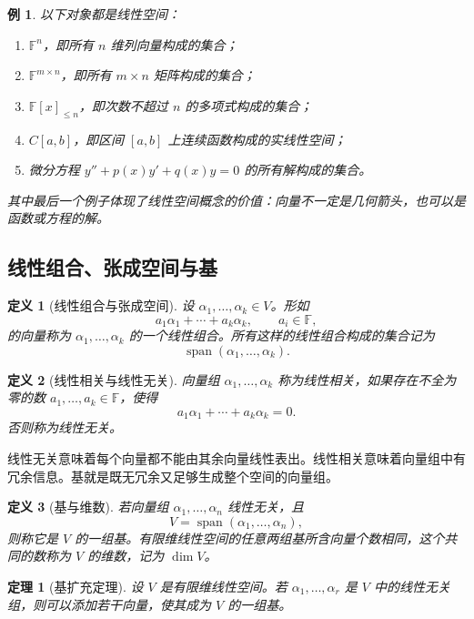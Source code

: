 \documentclass[UTF8,openany,zihao=-4]{ctexbook}
\theoremstyle{cnplain}
\newtheorem{definition}{定义}[chapter]
\newtheorem{theorem}{定理}[chapter]
\newtheorem{example}{例}[chapter]
\newcommand{\F}{\mathbb F}
\newcommand{\Span}{\operatorname{span}}
\begin{document}
\begin{example}
以下对象都是线性空间：
\begin{enumerate}
  \item $\F^n$，即所有 $n$ 维列向量构成的集合；
  \item $\F^{m\times n}$，即所有 $m\times n$ 矩阵构成的集合；
  \item $\F[x]_{\le n}$，即次数不超过 $n$ 的多项式构成的集合；
  \item $C[a,b]$，即区间 $[a,b]$ 上连续函数构成的实线性空间；
  \item 微分方程 $y''+p(x)y'+q(x)y=0$ 的所有解构成的集合。
\end{enumerate}
其中最后一个例子体现了线性空间概念的价值：向量不一定是几何箭头，也可以是函数或方程的解。
\end{example}

\subsection{线性组合、张成空间与基}

\begin{definition}[线性组合与张成空间]
设 $\alpha_1,\ldots,\alpha_k\in V$。形如
\[
a_1\alpha_1+\cdots+a_k\alpha_k,\qquad a_i\in\F,
\]
的向量称为 $\alpha_1,\ldots,\alpha_k$ 的一个线性组合。所有这样的线性组合构成的集合记为
\[
\Span(\alpha_1,
\ldots,\alpha_k).
\]
\end{definition}

\begin{definition}[线性相关与线性无关]
向量组 $\alpha_1,\ldots,\alpha_k$ 称为线性相关，如果存在不全为零的数 $a_1,
\ldots,a_k\in\F$，使得
\[
a_1\alpha_1+\cdots+a_k\alpha_k=0.
\]
否则称为线性无关。
\end{definition}

线性无关意味着每个向量都不能由其余向量线性表出。线性相关意味着向量组中有冗余信息。基就是既无冗余又足够生成整个空间的向量组。

\begin{definition}[基与维数]
若向量组 $\alpha_1,\ldots,\alpha_n$ 线性无关，且
\[
V=\Span(\alpha_1,
\ldots,\alpha_n),
\]
则称它是 $V$ 的一组基。有限维线性空间的任意两组基所含向量个数相同，这个共同的数称为 $V$ 的维数，记为 $\dim V$。
\end{definition}

\begin{theorem}[基扩充定理]
设 $V$ 是有限维线性空间。若 $\alpha_1,
\ldots,\alpha_r$ 是 $V$ 中的线性无关组，则可以添加若干向量，使其成为 $V$ 的一组基。
\end{theorem}
\end{document}
